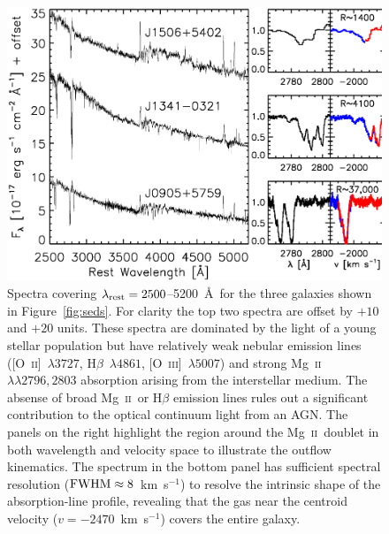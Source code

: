 \documentclass[12pt,preprint]{aastex}
\newcommand{\kms}{km~s$^{-1}$}
\newcommand{\mgii}{\textrm{Mg}~\textsc{ii}}
\newcommand{\oii}{[\textrm{O}~\textsc{ii}]}
\newcommand{\oiii}{[\textrm{O}~\textsc{iii}]}
\newcommand{\lrest}{\lambda_{\textnormal{\scriptsize{rest}}}}
\begin{document}
\begin{figure}[!t]
\begin{center}
\includegraphics[angle=0,scale=0.7]{f3.ps}
\caption{Spectra covering $\lrest=2500$--5200~\AA\ for the three
  galaxies shown in Figure~\ref{fig:seds}.  For clarity the top two
  spectra are offset by $+10$ and $+20$ units.  These spectra are
  dominated by the light of a young stellar population but have
  relatively weak nebular emission lines (\oii~$\lambda3727$,
  H$\beta$~$\lambda4861$, \oiii~$\lambda5007$) and strong
  \mgii~$\lambda\lambda2796,2803$ absorption arising from the
  interstellar medium.  The absense of broad \mgii\ or H$\beta$
  emission lines rules out a significant contribution to the optical
  continuum light from an AGN.  The panels on the right highlight the
  region around the \mgii\ doublet in both wavelength and velocity
  space to illustrate the outflow kinematics.  The spectrum in the
  bottom panel has sufficient spectral resolution
  ($\textnormal{FWHM}\approx8$~\kms) to resolve the intrinsic shape of
  the absorption-line profile, revealing that the gas near the
  centroid velocity ($v=-2470$~\kms) covers the entire galaxy.}
\label{fig:spectra}
\end{center}
\end{figure}

\clearpage
\end{document}
